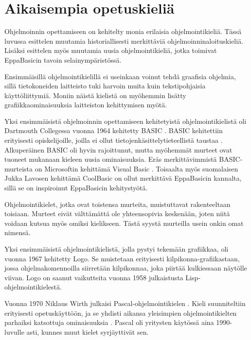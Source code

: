 
\section{Aikaisempia opetuskieliä}
Ohjelmoinnin opettamiseen on kehitelty
monia erilaisia ohjelmointikieliä.
Tässä luvussa esittelen muutamia
historiallisesti merkittäviä
ohjelmoinninaloituskieliä.
Lisäksi esittelen myös muutamia uusia
ohjelmointikieliä, jotka toimivat
EppaBasicin tavoin selainympäristössä.

Ensimmäisillä ohjelmointikielillä
ei useinkaan voinut tehdä graafisia
ohjelmia, sillä tietokoneiden
laitteisto tuki harvoin
muita kuin tekstipohjaisia
käyttöliittymiä.
Moniin näistä kielistä
on myöhemmin lisätty
grafiikkaominaisuuksia laitteiston
kehittymisen myötä.

Yksi ensimmäisistä ohjelmoinnin
opettamiseen kehitetyistä
ohjelmointikielistä oli
Dartmouth Collegessa vuonna 1964
kehitetty BASIC \cite{basic}.
BASIC kehitettiin erityisesti
opiskelijoille, joilla ei ollut
tietojenkäsittelytieteellistä
taustaa \cite{language_history}.
Alkuperäinen BASIC oli hyvin
rajoittunut, mutta myöhemmät
murteet ovat tuoneet mukanaan
kieleen uusia ominaisuuksia.
Eräs merkittävimmistä
BASIC-murteista on
Microsoftin kehittämä
Visual Basic \cite{vb.net}.
Toisaalta myös suomalaisen
Jukka Lavosen kehittämä
CoolBasic \cite{cb} on ollut merkittävä
EppaBasicin kannalta, sillä
se on inspiroinut EppaBasicin
kehitystyötä.

Ohjelmointikielet, jotka ovat
toistensa murteita,
muistuttavat rakenteeltaan
toisiaan.
Murteet eivät välttämättä
ole yhteensopivia keskenään,
joten niitä voidaan kutsua
myös omiksi kielikseen.
Tästä syystä murteilla
usein onkin omat nimensä.

Yksi ensimmäisistä ohjelmointikielistä,
jolla pystyi tekemään grafiikkaa,
oli vuonna 1967 kehitetty Logo.
Se muistetaan erityisesti
kilpikonna-grafiikastaan,
jossa ohjelmakomennoilla
siirretään kilpikonnaa,
joka piirtää kulkiessaan
näytölle viivan.
Logo on saanut vaikutteita vuonna 1958
julkaistusta Lisp-ohjelmointikielestä.

Vuonna 1970 Niklaus Wirth
julkaisi Pascal-ohjelmointikielen
\cite{pascal}.
Kieli suunniteltiin erityisesti
opetuskäyttöön, ja se yhdisti
aikansa yleisimpien ohjelmointikielten
parhaiksi katsottuja ominaisuuksia
\cite{language_history}.
Pascal oli yritysten käytössä aina
1990-luvulle asti, kunnes muut kielet
syrjäyttivät sen.

